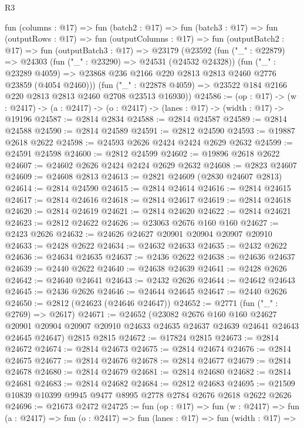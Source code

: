 \begin{lexlean}{R3}
\begin{coremodule}
  fun (columns : @17) =>
  fun (batch2 : @17) =>
  fun (batch3 : @17) =>
  fun (outputRows : @17) =>
  fun (outputColumns : @17) =>
  fun (outputBatch2 : @17) =>
  fun (outputBatch3 : @17) =>
  @23179
    (@23592
      (fun ("_" : @22879) =>
      @24303
        (fun ("_" : @23290) => @24531 (@24532 @24328))
        (fun ("_" : @23289 @4059) =>
        @23868 @236 @2166 @220 @2813 @2813 @2460 @2776 @23859 (@4054 @2460)))
      (fun ("_" : @22878 @4059) => @23522 @184 @2166 @220 @2813 @2813 @2460 @2708 @23513 @16930))
@24586 := (op : @17) ->
  (w : @2417) -> (a : @2417) -> (o : @2417) -> (lanes : @17) -> (width : @17) -> @19196
@24587 := @2814 @2834
@24588 := @2814 @24587
@24589 := @2814 @24588
@24590 := @2814 @24589
@24591 := @2812 @24590
@24593 := @19887 @2618 @2622
@24598 := @24593 @2626 @2424 @2424 @2629 @2632
@24599 := @24591 @24598
@24600 := @2812 @24599
@24602 := @19896 @2618 @2622
@24607 := @24602 @2626 @2424 @2424 @2629 @2632
@24608 := @2823 @24607
@24609 := @24608 @2813
@24613 := @2821 @24609 (@2830 @24607 @2813)
@24614 := @2814 @24590
@24615 := @2814 @24614
@24616 := @2814 @24615
@24617 := @2814 @24616
@24618 := @2814 @24617
@24619 := @2814 @24618
@24620 := @2814 @24619
@24621 := @2814 @24620
@24622 := @2814 @24621
@24623 := @2812 @24622
@24626 := @23063 @2676 @160 @160
@24627 := @2423 @2626
@24632 := @24626 @24627 @20901 @20904 @20907 @20910
@24633 := @2428 @2622
@24634 := @24632 @24633
@24635 := @2432 @2622
@24636 := @24634 @24635
@24637 := @2436 @2622
@24638 := @24636 @24637
@24639 := @2440 @2622
@24640 := @24638 @24639
@24641 := @2428 @2626
@24642 := @24640 @24641
@24643 := @2432 @2626
@24644 := @24642 @24643
@24645 := @2436 @2626
@24646 := @24644 @24645
@24647 := @2440 @2626
@24650 := @2812 (@24623 (@24646 @24647))
@24652 := @2771 (fun ("_" : @2769) => @2617)
@24671 := @24652
    (@23082
      @2676
      @160
      @160
      @24627
      @20901
      @20904
      @20907
      @20910
      @24633
      @24635
      @24637
      @24639
      @24641
      @24643
      @24645
      @24647)
    @2815
    @2815
@24672 := @17824 @2815
@24673 := @2814 @24672
@24674 := @2814 @24673
@24675 := @2814 @24674
@24676 := @2814 @24675
@24677 := @2814 @24676
@24678 := @2814 @24677
@24679 := @2814 @24678
@24680 := @2814 @24679
@24681 := @2814 @24680
@24682 := @2814 @24681
@24683 := @2814 @24682
@24684 := @2812 @24683
@24695 := @21509 @10839 @10399 @9945 @9477 @8995 @2778 @2784 @2676 @2618 @2622 @2626
@24696 := @21673 @2472
@24725 := fun (op : @17) =>
  fun (w : @2417) =>
  fun (a : @2417) =>
  fun (o : @2417) =>
  fun (lanes : @17) =>
  fun (width : @17) =>

\end{coremodule}
\end{lexlean}
